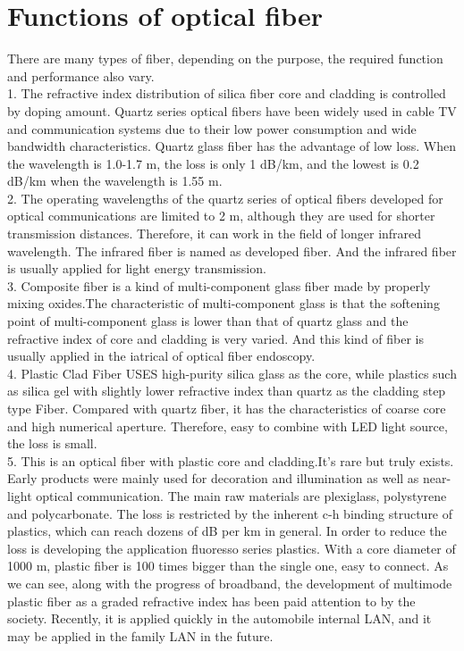 \documentclass[a4paper]{article}
\begin{document}
\section{Functions of optical fiber}
\label{sec:Sec7}
There are many types of fiber, depending on the purpose, the required function and performance also vary.
\\

1. The refractive index distribution of silica fiber core and cladding is controlled by doping amount. Quartz series optical fibers have been widely used in cable TV and communication systems due to their low power consumption and wide bandwidth characteristics. Quartz glass fiber has the advantage of low loss. When the wavelength is 1.0-1.7 m, the loss is only 1 dB/km, and the lowest is 0.2 dB/km when the wavelength is 1.55 m.\cite{Optical Fibre}
\\

2. The operating wavelengths of the quartz series of optical fibers developed for optical communications are limited to 2 m, although they are used for shorter transmission distances. Therefore, it can work in the field of longer infrared wavelength. The infrared fiber is named as developed fiber. And the infrared fiber is usually applied for light energy transmission.\cite{Optical Fibre}
\\

3. Composite fiber is a kind of multi-component glass fiber made by properly mixing oxides.The characteristic of multi-component glass is that the softening point of multi-component glass is lower than that of quartz glass and the refractive index of core and cladding is very varied. And this kind of fiber is usually applied in the iatrical of optical fiber endoscopy.\cite{Optical Fibre}
\\

4. Plastic Clad Fiber USES high-purity silica glass as the core, while plastics such as silica gel with slightly lower refractive index than quartz as the cladding step type Fiber. Compared with quartz fiber, it has the characteristics of coarse core and high numerical aperture. Therefore, easy to combine with LED light source, the loss is small.\cite{Analogue optical fibre communications}
\\

5. This is an optical fiber with plastic core and cladding.It's rare but truly exists. Early products were mainly used for decoration and illumination as well as near-light optical communication. The main raw materials are plexiglass, polystyrene and polycarbonate. The loss is restricted by the inherent c-h binding structure of plastics, which can reach dozens of dB per km in general. In order to reduce the loss is developing the application fluoresso series plastics. With a core diameter of 1000 m, plastic fiber is 100 times bigger than the single one, easy to connect. As we can see, along with the progress of broadband, the development of multimode plastic fiber as a graded refractive index has been paid attention to by the society. Recently, it is applied quickly in the automobile internal LAN, and it may be applied in the family LAN in the future.\cite{Optical Fibre}
\\
\end{document}
